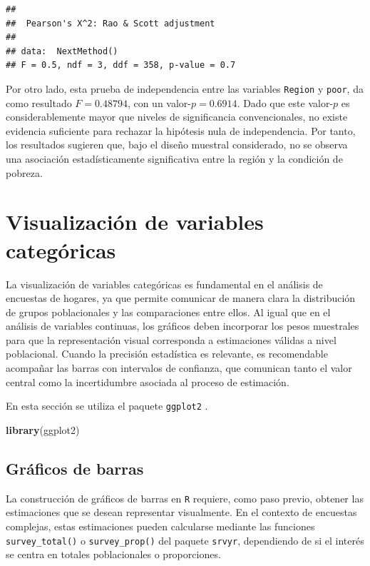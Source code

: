 \documentclass[
  spanish,
  12pt,
]{book}
\newenvironment{Shaded}{\begin{snugshade}}{\end{snugshade}}
\newcommand{\FunctionTok}[1]{\textcolor[rgb]{0.13,0.29,0.53}{\textbf{#1}}}
\newcommand{\NormalTok}[1]{#1}
\begin{document}
\begin{verbatim}
## 
##  Pearson's X^2: Rao & Scott adjustment
## 
## data:  NextMethod()
## F = 0.5, ndf = 3, ddf = 358, p-value = 0.7
\end{verbatim}

Por otro lado, esta prueba de independencia entre las variables \texttt{Region} y \texttt{poor}, da como resultado \(F = 0.48794\), con un valor-\(p = 0.6914\). Dado que este valor-\(p\) es considerablemente mayor que niveles de significancia convencionales, no existe evidencia suficiente para rechazar la hipótesis nula de independencia. Por tanto, los resultados sugieren que, bajo el diseño muestral considerado, no se observa una asociación estadísticamente significativa entre la región y la condición de pobreza.

\section{Visualización de variables categóricas}\label{viz-categoricas}

La visualización de variables categóricas es fundamental en el análisis de encuestas de hogares, ya que permite comunicar de manera clara la distribución de grupos poblacionales y las comparaciones entre ellos. Al igual que en el análisis de variables continuas, los gráficos deben incorporar los pesos muestrales para que la representación visual corresponda a estimaciones válidas a nivel poblacional. Cuando la precisión estadística es relevante, es recomendable acompañar las barras con intervalos de confianza, que comunican tanto el valor central como la incertidumbre asociada al proceso de estimación.

En esta sección se utiliza el paquete \texttt{ggplot2} \citep{ggplot22026}.

\begin{Shaded}
\begin{Highlighting}[]
\FunctionTok{library}\NormalTok{(ggplot2)}
\end{Highlighting}
\end{Shaded}

\subsection{Gráficos de barras}\label{graficos-de-barras}

La construcción de gráficos de barras en \texttt{R} requiere, como paso previo, obtener las estimaciones que se desean representar visualmente. En el contexto de encuestas complejas, estas estimaciones pueden calcularse mediante las funciones \texttt{survey\_total()} o \texttt{survey\_prop()} del paquete \texttt{srvyr}, dependiendo de si el interés se centra en totales poblacionales o proporciones.
\end{document}
